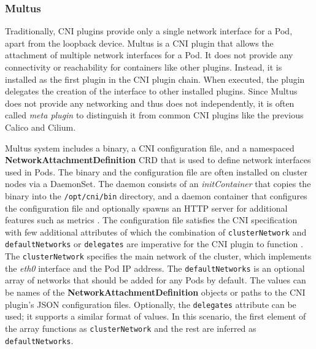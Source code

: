 \documentclass[english, 12pt, a4paper, sci, utf8, a-2b, online]{aaltothesis}
\newcommand{\mycomment}[3]{\textcolor{#1}{#2:~#3}}
\newcommand{\jb}[1]{\noindent\mycomment{aaltoRed}{JB}{#1}}
\begin{document}

\subsubsection{Multus}

Traditionally, CNI plugins provide only a single network interface for a Pod, apart from the loopback device.
Multus \cite{multus-cni} is a CNI plugin that allows the attachment of multiple network interfaces for a Pod.
It does not provide any connectivity or reachability for containers like other plugins.
Instead, it is installed as the first plugin in the CNI plugin chain.
When executed, the plugin delegates the creation of the interface to other installed plugins.
Since Multus does not provide any networking and thus does not independently, it is often called \emph{meta plugin} to distinguish it from common CNI plugins like the previous Calico and Cilium.

Multus system includes a binary, a CNI configuration file, and a namespaced \textbf{NetworkAttachmentDefinition} CRD that is used to define network interfaces used in Pods.
The binary and the configuration file are often installed on cluster nodes via a DaemonSet.
The daemon consists of an \emph{initContainer} that copies the binary into the \lstinline{/opt/cni/bin} directory, and a daemon container that configures the configuration file and optionally spawns an HTTP server for additional features such as metrics \cite{multus-cni}.
The configuration file satisfies the CNI specification with few additional attributes of which the combination of \lstinline{clusterNetwork} and \lstinline{defaultNetworks} or \lstinline{delegates} are imperative for the CNI plugin to function \cite{multus-cni-config}.
The \lstinline{clusterNetwork} specifies the main network of the cluster, which implements the \emph{eth0} interface and the Pod IP address.
The \lstinline{defaultNetworks} is an optional array of networks that should be added for any Pods by default.
The values can be names of the \textbf{NetworkAttachmentDefinition} objects or paths to the CNI plugin's JSON configuration files.
Optionally, the \lstinline{delegates} attribute can be used; it supports a similar format of values.
In this scenario, the first element of the array functions as \lstinline{clusterNetwork} and the rest are inferred as \lstinline{defaultNetworks}.
\end{document}
